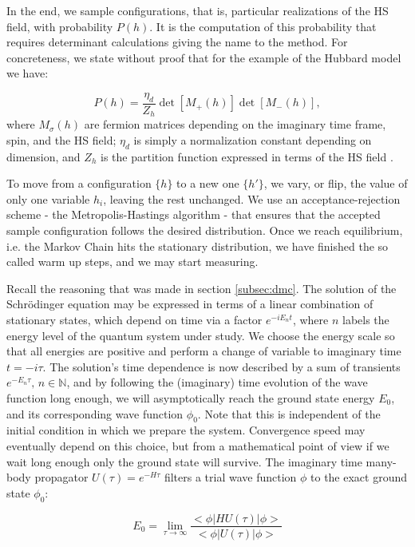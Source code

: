 In the end, we sample configurations, that is, particular realizations of the HS field, with probability $P(h)$. It is the computation of this probability that requires determinant calculations giving the name to the method. For concreteness, we state without proof that for the example of the Hubbard model we have:

\begin{equation}
P(h) = \frac{\eta_d}{Z_h} \det [ M_{+}(h) ] \det [ M_{-}(h) ] ,
\end{equation}
where $M_\sigma (h)$ are fermion matrices depending on the imaginary time frame, spin, and the HS field; $\eta_d$ is simply a normalization constant depending on dimension, and $Z_h$ is the partition function expressed in terms of the HS field \cite{qmc}.

To move from a configuration $\{h\}$ to a new one $\{h'\}$, we vary, or flip, the value of only one variable $h_i$, leaving the rest unchanged. We use an acceptance-rejection scheme - the Metropolis-Hastings algorithm - that ensures that the accepted sample configuration follows the desired distribution. Once we reach equilibrium, i.e. the Markov Chain hits the stationary distribution, we have finished the so called warm up steps, and we may start measuring.\par

Recall the reasoning that was made in section \ref{subsec:dmc}. The solution of the Schr\"odinger equation may be expressed in terms of a linear combination of stationary states, which depend on time via a factor $e^{-iE_n t}$, where $n$ labels the energy level of the quantum system under study. We choose the energy scale so that all energies are positive and perform a change of variable to imaginary time $t= -i\tau$. The solution's time dependence is now described by a sum of transients $e^{-E_n \tau}, \, n \in \mathbb{N}$, and by following the (imaginary) time evolution of the wave function long enough, we will asymptotically reach the ground state energy $E_0$, and its corresponding wave function $\phi_0$. Note that this is independent of the initial condition in which we prepare the system. Convergence speed may eventually depend on this choice, but from a mathematical point of view if we wait long enough only the ground state will survive. The imaginary time many-body propagator $U(\tau) = e^{-H\tau}$ filters a trial wave function $\phi$ to the exact ground state $\phi_0$:

\begin{equation}
E_0 = \lim_{\tau \rightarrow \infty} \frac{<\phi | HU(\tau) | \phi >}{<\phi | U(\tau) | \phi >}
\end{equation}


